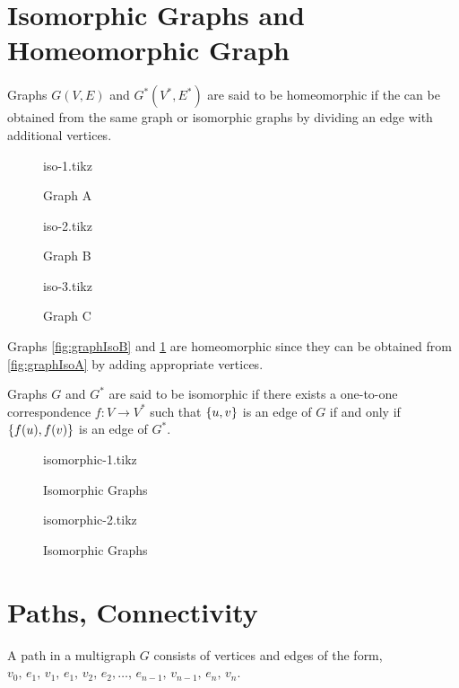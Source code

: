 \documentclass[../main-sheet.tex]{subfiles}
\begin{document}
\section{Isomorphic Graphs and Homeomorphic Graph}
Graphs $ G(V,E) $ and $ G^*(V^*,E^*) $ are said to be homeomorphic if the can be obtained from the same graph or isomorphic graphs by dividing an edge with additional vertices.
\begin{figure}[H]
    \begin{minipage}[b]{.3\textwidth}
        \centering
        {iso-1.tikz}
        \caption{Graph A}
        \label{fig:graphIsoA}
    \end{minipage}
    \begin{minipage}[b]{.3\textwidth}
        \centering
        {iso-2.tikz}
        \caption{Graph B}
        \label{fig:graphIsoB}
    \end{minipage}
    \begin{minipage}[b]{.3\textwidth}
        \centering
        {iso-3.tikz}
        \caption{Graph C}
        \label{fig:graphIsoC}
    \end{minipage}
\end{figure}
Graphs \ref{fig:graphIsoB} and \ref{fig:graphIsoC} are homeomorphic since they can be obtained from \ref{fig:graphIsoA} by adding appropriate vertices.

Graphs $ G $ and $ G^* $ are said to be isomorphic if there exists a one-to-one correspondence $ f:V\to V^* $ such that $ \left\{u,v\right\} $ is an edge of $ G $ if and only if $ \left\{f(u),f(v)\right\} $ is an edge of $ G^* $. 
\begin{figure}[H]
    \begin{minipage}[b]{.5\textwidth}
        \centering
        {isomorphic-1.tikz}
        \caption{Isomorphic Graphs}
        \label{fig:isoGraphA}
    \end{minipage}
    \begin{minipage}[b]{.5\textwidth}
        \centering
        {isomorphic-2.tikz}
        \caption{Isomorphic Graphs}
        \label{fig:isoGraphB}
    \end{minipage}
\end{figure}
\section{Paths, Connectivity}
A path in a multigraph $ G $ consists of vertices and edges of the form,\\
\indent\indent $ v_0,\,e_1,\,v_1,\,e_1,\,v_2,\,e_2,\dots,\,e_{n-1},\,v_{n-1},\,e_n,\,v_n $.
\end{document}
